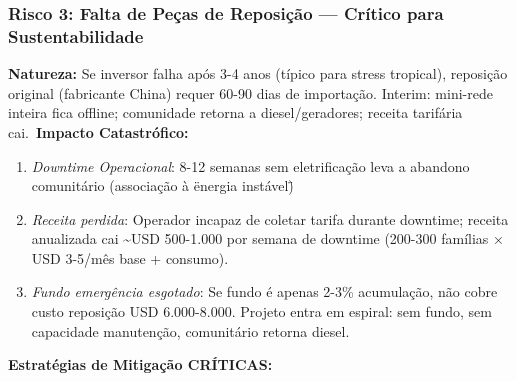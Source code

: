 \documentclass[12pt, a4paper]{article}
\begin{document}
\subsubsection{Risco 3: Falta de Peças de Reposição — Crítico para Sustentabilidade}
\textbf{Natureza:} Se inversor falha após 3-4 anos (típico para stress tropical), reposição original (fabricante China) requer 60-90 dias de importação. Interim: mini-rede inteira fica offline; comunidade retorna a diesel/geradores; receita tarifária cai.\
\textbf{Impacto Catastrófico:} \
\begin{enumerate}
\item\textit{Downtime Operacional}: 8-12 semanas sem eletrificação leva a abandono comunitário (associação à \"energia instável\")\

\item\textit{Receita perdida}: Operador incapaz de coletar tarifa durante downtime; receita anualizada cai \textasciitilde{}USD 500-1.000 por semana de downtime (200-300 famílias × USD 3-5/mês base + consumo).\

\item\textit{Fundo emergência esgotado}: Se fundo é apenas 2-3\% acumulação, não cobre custo reposição USD 6.000-8.000. Projeto entra em espiral: sem fundo, sem capacidade manutenção, comunitário retorna diesel.\
\end{enumerate}\textbf{Estratégias de Mitigação CRÍTICAS:}\
\end{document}
